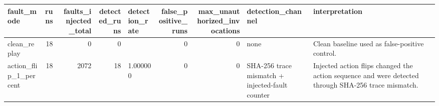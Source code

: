 \begin{tabular}{lrrrlrrll}
\toprule
fault\_mode & runs & faults\_injected\_total & detected\_runs & detection\_rate & false\_positive\_runs & max\_unauthorized\_invocations & detection\_channel & interpretation \\
\midrule
clean\_replay & 18 & 0 & 0 &  & 0 & 0 & none & Clean baseline used as false-positive control. \\
action\_flip\_1\_percent & 18 & 2072 & 18 & 1.000000 & 0 & 0 & SHA-256 trace mismatch + injected-fault counter & Injected action flips changed the action sequence and were detected through SHA-256 trace mismatch. \\
\bottomrule
\end{tabular}
